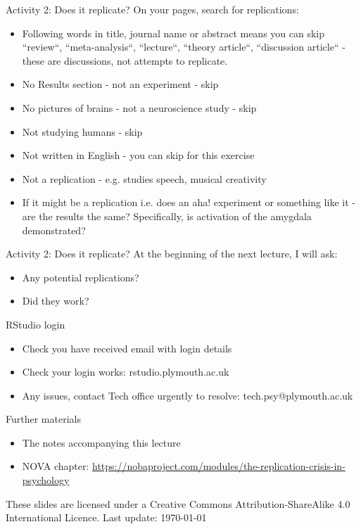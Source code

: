 \documentclass{beamer}
\begin{document}
\begin{frame}{Activity 2: Does it replicate?} 
  On your pages, search for replications:
  \begin{itemize}
  \item Following words in title, journal name or abstract means you can skip ``review``, ``meta-analysis``, ``lecture``, ``theory article``, ``discussion article`` - these are discussions, not attempts to replicate.
  \item No Results section - not an experiment - skip
  \item No pictures of brains - not a neuroscience study - skip
  \item Not studying humans - skip
  \item Not written in English - you can skip for this exercise
  \item Not a replication - e.g. studies speech, musical creativity
  \item If it might be a replication i.e. does an aha! experiment or something like it - are the results the same? Specifically, is activation of the amygdala demonstrated?
  \end{itemize}
\end{frame}

\begin{frame}{Activity 2: Does it replicate?}
  At the beginning of the next lecture, I will ask:
  \begin{itemize}
  \item Any potential replications?
  \item Did they work?
  \end{itemize}
\end{frame}

\begin{frame}{RStudio login}
  \begin{itemize}
    \item Check you have received email with login details
    \item Check your login works: rstudio.plymouth.ac.uk
    \item Any issues, contact Tech office urgently to resolve: tech.psy@plymouth.ac.uk
    \end{itemize}
\end{frame}

\begin{frame}{Further materials}
  \begin{itemize}
  \item The notes accompanying this lecture
  \item NOVA chapter: \url{ https://nobaproject.com/modules/the-replication-crisis-in-psychology}
  \end{itemize}
  \vspace{12pt}    
      \tiny
These slides are licensed under a Creative Commons Attribution-ShareAlike
4.0 International Licence. Last update: \today
    
\end{frame}
\end{document}
